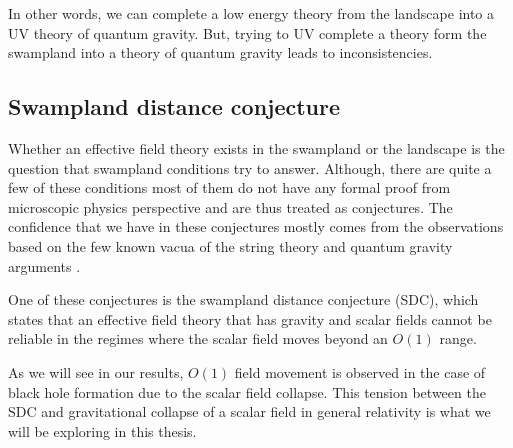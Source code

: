 
In other words, we can complete a low energy theory from the landscape into a UV theory of quantum gravity. But, trying to UV complete a theory form the swampland into a theory of quantum gravity leads to inconsistencies.

\subsection{Swampland distance conjecture}
Whether an effective field theory exists in the swampland or the landscape is the question that swampland conditions try to answer. Although, there are quite a few of these conditions most of them do not have any formal proof from microscopic physics perspective and are thus treated as conjectures. The confidence that we have in these conjectures mostly comes from the observations based on the few known vacua of the string theory and quantum gravity arguments \citep{Brennan:2017rbf}.



One of these conjectures is the swampland distance conjecture (SDC), which states that an effective field theory that has gravity and scalar fields cannot be reliable in the regimes where the scalar field moves beyond an $O(1)$ range.

As we will see in our results, $O(1)$ field movement is observed in the case of black hole formation due to the scalar field collapse. This tension between the SDC and gravitational collapse of a scalar field in general relativity is what we will be exploring in this thesis.